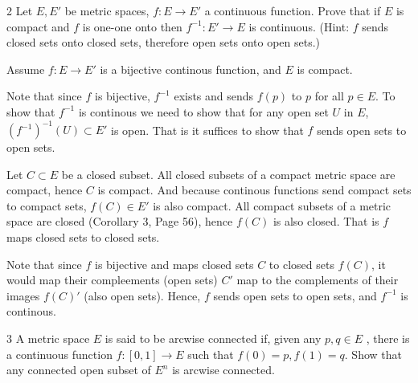 \documentclass[12pt]{article}
\begin{document}
\newpage 

\begin{problem}{2}
     Let $E , E'$ be metric spaces, $f : E \to E'$ a continuous function. Prove that if $E$ is compact and $f$ is one-one onto then $f^{-1}: E'\to E$ is continuous. (Hint: $f$ sends closed sets onto closed sets, therefore open sets onto open sets.)
\end{problem}

\begin{solution}
    \bbni

    Assume $f: E \to E'$ is a bijective continous function, and $E$ is compact.
    
    Note that since $f$ is bijective, $f^{-1}$ exists and sends $f(p)$ to $p$ for all $p \in E$. To show that $f^{-1}$ is continous we need to show that for any open set $U$ in $E$, $(f^{-1})^{-1}(U) \subset E'$ is open. That is it suffices to show that $f$ sends open sets to open sets.  

    Let $C \subset E$ be a closed subset. All closed subsets of a compact metric space are compact, hence $C$ is compact. And because continous functions send compact sets to compact sets, $f(C) \in E'$ is also compact. All compact subsets of a metric space are closed (Corollary 3, Page 56), hence $f(C)$ is also closed. That is $f$ maps closed sets to closed sets. 
    
    Note that since $f$ is bijective and maps closed sets $C$ to closed sets $f(C)$, it would map their compleements (open sets) $C'$ map to the complements of their images $f(C)'$ (also open sets). Hence, $f$ sends open sets to open sets, and $f^{-1}$ is continous. 
\end{solution}

\newpage 

\begin{problem}{3}
    A metric space $E$ is said to be arcwise connected if, given any $p, q \in E$ , there is a continuous function $f: [0, 1] \to E$ such that $f(0) = p, f(1) = q$. Show that any connected open subset of $E^n$ is arcwise connected.
\end{problem}
\end{document}

